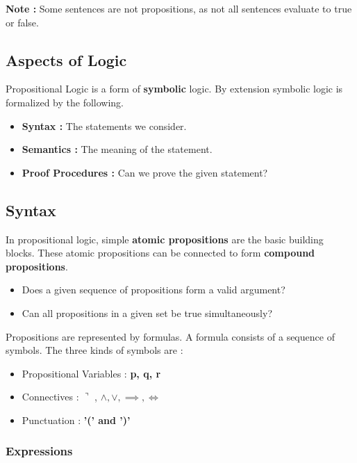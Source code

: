 \documentclass{article}
\newenvironment{ablock}[1]{%
    \tcolorbox[beamer,%
    noparskip,breakable,
    colback=lightcoral,colframe=darkred,%
    colbacklower=tomato!75!lightcoral,%
    title=#1]}%
    {\endtcolorbox}
\begin{document}
\textbf{Note : } Some sentences are not propositions, as not all sentences evaluate to true or false. 

\subsection{Aspects of Logic}
Propositional Logic is a form of \textbf{symbolic} logic. By extension symbolic logic is formalized by the following.

\begin{itemize}
\item \textbf{Syntax : }The statements we consider.
\item \textbf{Semantics : } The meaning of the statement.
\item \textbf{Proof Procedures : } Can we prove the given statement? 
\end{itemize}

\subsection{Syntax}

In propositional logic, simple \textbf{atomic propositions} are the basic building blocks. These atomic propositions can be connected to form \textbf{compound propositions}. 

\begin{ablock}{Questions to consider}
\begin{itemize}
\item Does a given sequence of propositions form a valid argument? 
\item Can all propositions in a given set be true simultaneously? 
\end{itemize}
\end{ablock} 

Propositions are represented by formulas. 
A formula consists of a sequence of symbols. The three kinds of symbols are : 
\begin{itemize}
\item Propositional Variables : \textbf{p, q, r}
\item Connectives : \(\urcorner\) , \(\wedge, \vee, \implies, \iff\)
\item Punctuation  : \textbf{ '(' and ')'}
\end{itemize}

\subsubsection{Expressions}
\end{document}
